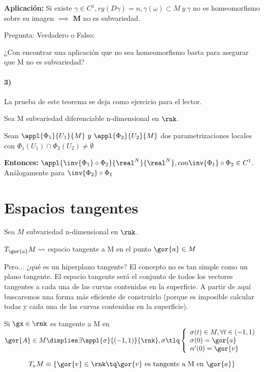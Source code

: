 \textbf{Aplicación:} Si existe $\gamma \in C^1, rg(D\gamma) = n, \gamma(\omega)\subset M \ y \ \gamma
$ no es homeomorfismo sobre su imagen $\implies$ \textbf{M} no es subvariedad.

Pregunta: Verdadero o Falso:

¿Con encontrar una aplicación que no sea homeomorfismo basta para asegurar que M no es subvariedad?

\paragraph{3)\\}

La prueba de este teorema se deja como ejercicio para el lector.

\begin{theorem}
Sea M subvariedad diferenciable n-dimensional en $\rnk$.

Sean $\appl{\Phi_1}{U_1}{M} \ y \ \appl{\Phi_2}{U_2}{M}$ dos parametrizaciones locales con $\Phi_1(U_1)\cap \Phi_2(U_2)\neq \emptyset$

\textbf{Entonces:} $\appl{\inv{\Phi_1}\circ \Phi_2}{\real^N}{\real^N}, con \inv{\Phi_1}\circ \Phi_2 \in C^1$. Análogamente para $\inv{\Phi_2}\circ\Phi_1$
\end{theorem}

\section{Espacios tangentes}

Sea $M$ subvariedad n-dimensional en $\rnk$.

$T_{\gor{a}}M \leadsto$ espacio tangente a M en el punto $\gor{a}\in M$

Pero... ¿qué es un hiperplano tangente? El concepto no es tan simple como un plano tangente. El espacio tangente será el conjunto de todos los vectores tangentes a cada una de las curvas contenidas en la superficie. A partir de aquí buscaremos una forma más eficiente de construirlo (porque es imposible calcular todas y cada una de las curvas contenidas en la superficie).

\begin{defn}
Si $\gx \in \rnk$ es tangente a M en $\gor{A} \in M \dimplies \exists \appl{\sigma}{(-1,1)}{\rnk}, \sigma \tlq \left\{\begin{array}{lc}
\sigma(t) \in M, \forall t\in (-1,1)\\
\sigma(0) = \gor{a}\\
\alpha'(0) = \gor{v}
\end{array}\right.$
\end{defn}
\begin{defn}
\[T_aM \equiv \{ \gor{v} \in \rnk \tq \gor{v} \text{ es tangente a M en }\gor{a}\}\]
\end{defn}


